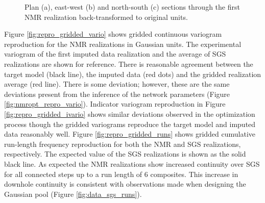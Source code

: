 
\begin{figure}
    \centering
    \tabskip=0pt
    \caption{Plan (a), east-west (b) and north-south (c) sections through the first \gls{NMR} realization back-transformed to original units.}
    \label{fig:orig_reals}
\end{figure}


Figure \ref{fig:repro_gridded_vario} shows gridded continuous variogram reproduction for the \gls{NMR} realizations in Gaussian units. The experimental variogram of the first imputed data realization and the average of \gls{SGS} realizations are shown for reference. There is reasonable agreement between the target model (black line), the imputed data (red dots) and the gridded realization average (red line). There is some deviation; however, these are the same deviations present from the inference of the network parameters (Figure \ref{fig:nmropt_repro_vario}). Indicator variogram reproduction in Figure \ref{fig:repro_gridded_ivario} shows similar deviations observed in the optimization process though the gridded variograms reproduce the target model and imputed data reasonably well. Figure \ref{fig:repro_gridded_runs} shows gridded cumulative run-length frequency reproduction for both the \gls{NMR} and \gls{SGS} realizations, respectively. The expected value of the \gls{SGS} realizations is shown as the solid black line. As expected the \gls{NMR} realizations show increased continuity over \gls{SGS} for all connected steps up to a run length of 6 composites. This increase in downhole continuity is consistent with observations made when designing the Gaussian pool (Figure \ref{fig:data_sgs_runs}).


